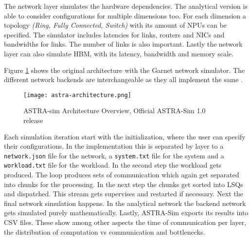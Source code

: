 The network layer simulates the hardware dependencies. The analytical version is able to consider configurations for multiple dimensions too. For each dimension a topology \textit{(Ring, Fully Connected, Switch)} with its amount of \acp{NPU} can be specified. The simulator includes latencies for links, routers and \acp{NIC} and bandwidths for links. The number of links is also important. Lastly the network layer can also simulate \ac{HBM}, with its latency, bandwidth and memory scale. 

Figure \ref{fig:astra-architecture} shows the original architecture with the Garnet network simulator. The different network backends are interchangeable as they all implement the same .

\begin{figure}[H]
    \centering
    \texttt{[image: astra-architecture.png]}
    \caption{ASTRA-sim Architecture Overview, Official ASTRA-Sim 1.0 release~\cite{rashidi_astra-sim_2020}}
  \label{fig:astra-architecture}
\end{figure}

Each simulation iteration start with the initialization, where the user can specify their configurations. In the implementation this is separated by layer to a \texttt{network.json} file for the network, a \texttt{system.txt} file for the system and a \texttt{workload.txt} file for the workload. 
In the second step the workload gets produced. The loop produces sets of communication which again get separated into chunks for the processing.
In the next step the chunks get sorted into \acp{LSQ} and dispatched. This stream gets supervises and restarted if necessary. 
Next the final network simulation happens. In the analytical network the backend network gets simulated purely mathematically.
Lastly, \ac{ASTRA-Sim} exports its results into \ac{CSV} files. These show among other aspects the time of communication per layer, the distribution of computation vs communication and bottlenecks.


